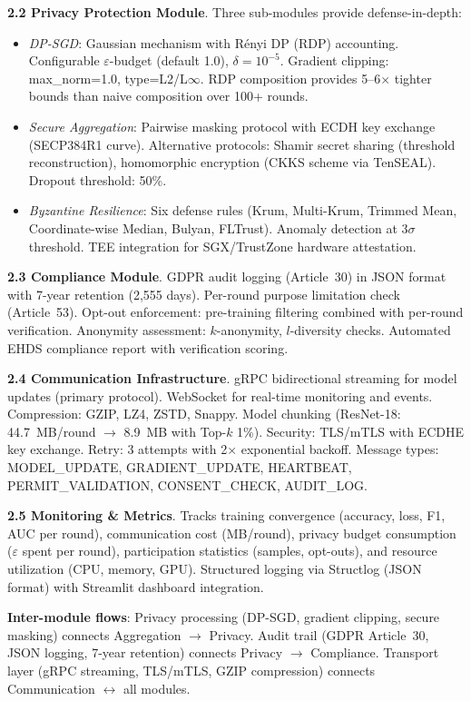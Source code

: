 \documentclass[conference]{IEEEtran}
\begin{document}
\textbf{2.2 Privacy Protection Module}. Three sub-modules provide defense-in-depth:
\begin{itemize}
    \item \textit{DP-SGD}: Gaussian mechanism with R\'enyi DP (RDP) accounting. Configurable $\varepsilon$-budget (default 1.0), $\delta{=}10^{-5}$. Gradient clipping: max\_norm=1.0, type=L2/L$\infty$. RDP composition provides 5--6$\times$ tighter bounds than naive composition over 100+ rounds.
    \item \textit{Secure Aggregation}: Pairwise masking protocol with ECDH key exchange (SECP384R1 curve). Alternative protocols: Shamir secret sharing (threshold reconstruction), homomorphic encryption (CKKS scheme via TenSEAL). Dropout threshold: 50\%.
    \item \textit{Byzantine Resilience}: Six defense rules (Krum, Multi-Krum, Trimmed Mean, Coordinate-wise Median, Bulyan, FLTrust). Anomaly detection at 3$\sigma$ threshold. TEE integration for SGX/TrustZone hardware attestation.
\end{itemize}

\textbf{2.3 Compliance Module}. GDPR audit logging (Article~30) in JSON format with 7-year retention (2,555 days). Per-round purpose limitation check (Article~53). Opt-out enforcement: pre-training filtering combined with per-round verification. Anonymity assessment: $k$-anonymity, $l$-diversity checks. Automated EHDS compliance report with verification scoring.

\textbf{2.4 Communication Infrastructure}. gRPC bidirectional streaming for model updates (primary protocol). WebSocket for real-time monitoring and events. Compression: GZIP, LZ4, ZSTD, Snappy. Model chunking (ResNet-18: 44.7~MB/round $\to$ 8.9~MB with Top-$k$ 1\%). Security: TLS/mTLS with ECDHE key exchange. Retry: 3 attempts with 2$\times$ exponential backoff. Message types: MODEL\_UPDATE, GRADIENT\_UPDATE, HEARTBEAT, PERMIT\_VALIDATION, CONSENT\_CHECK, AUDIT\_LOG.

\textbf{2.5 Monitoring \& Metrics}. Tracks training convergence (accuracy, loss, F1, AUC per round), communication cost (MB/round), privacy budget consumption ($\varepsilon$ spent per round), participation statistics (samples, opt-outs), and resource utilization (CPU, memory, GPU). Structured logging via Structlog (JSON format) with Streamlit dashboard integration.

\textbf{Inter-module flows}: Privacy processing (DP-SGD, gradient clipping, secure masking) connects Aggregation $\to$ Privacy. Audit trail (GDPR Article~30, JSON logging, 7-year retention) connects Privacy $\to$ Compliance. Transport layer (gRPC streaming, TLS/mTLS, GZIP compression) connects Communication $\leftrightarrow$ all modules.
\end{document}

